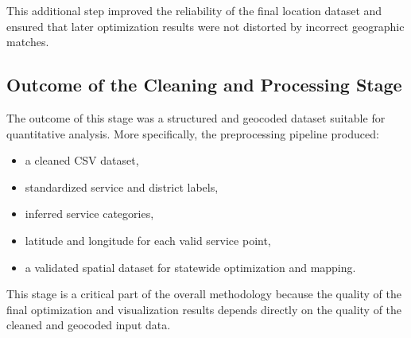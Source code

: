 This additional step improved the reliability of the final location dataset and ensured that later optimization results were not distorted by incorrect geographic matches.

\subsection{Outcome of the Cleaning and Processing Stage}

The outcome of this stage was a structured and geocoded dataset suitable for quantitative analysis. More specifically, the preprocessing pipeline produced:
\begin{itemize}
    \item a cleaned CSV dataset,
    \item standardized service and district labels,
    \item inferred service categories,
    \item latitude and longitude for each valid service point,
    \item a validated spatial dataset for statewide optimization and mapping.
\end{itemize}

This stage is a critical part of the overall methodology because the quality of the final optimization and visualization results depends directly on the quality of the cleaned and geocoded input data.
